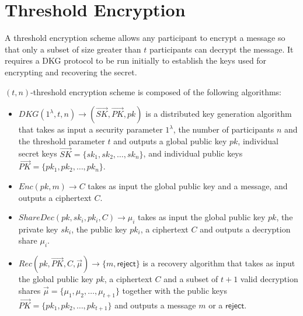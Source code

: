 \documentclass[letterpaper,twocolumn,10pt]{article}
\theoremstyle{definition}
\theoremstyle{remark}
\begin{document}
\section{Threshold Encryption}
\label{appendix:thresholdEnc}
A threshold encryption scheme allows any participant to encrypt a message so that only a subset of size greater than $t$ participants can decrypt the message. It requires a DKG protocol to be run initially to establish the keys used for encrypting and recovering the secret.

$(t, n)$-threshold encryption scheme is composed of the following algorithms:
\begin{itemize}
    \item $DKG(1^\lambda, t, n) \rightarrow (\vec{SK}, \vec{PK}, pk)$ is a distributed key generation algorithm that takes as input a security parameter $1^\lambda$, the number of participants $n$ and the threshold parameter $t$ and outputs a global public key $pk$, individual secret keys $\vec{SK} = \{sk_1, sk_2, \ldots, sk_n\}$, and individual public keys $\vec{PK} = \{pk_1, pk_2, \ldots,pk_n\}$.
    \item $Enc(pk, m) \rightarrow C$ takes as input the global public key and a message, and outputs a ciphertext $C$.
    \item $ShareDec(pk, sk_i, pk_i, C) \rightarrow \mu_i$ takes as input the global public key $pk$, the private key $sk_i$, the public key $pk_i$, a ciphertext $C$ and outputs a decryption share $\mu_i$.
    \item $Rec(pk, \vec{PK}, C, \vec{\mu} )\rightarrow \{m, \mathsf{reject}\}$ is a recovery algorithm that takes as input the global public key $pk$, a ciphertext $C$ and a subset of $t+1$ valid decryption shares $\vec{\mu} = \{\mu_1, \mu_2,\ldots, \mu_{t+1}\}$ together with the public keys $\vec{PK} = \{pk_1, pk_2,\ldots, pk_{t+1}\}$ and outputs a message $m$ or a $\mathsf{reject}$.
\end{itemize}
\end{document}

